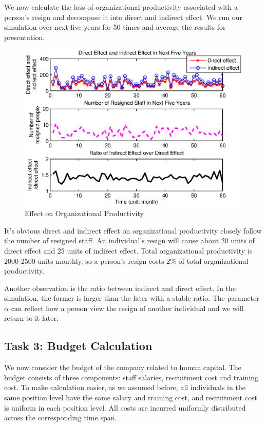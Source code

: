 \documentclass[tcn = 37075, sheet = false, abstract = false]{mcmthesis}
\begin{document}
We now calculate the loss of organizational productivity associated with a person's resign and decompose it into direct and indirect effect. We run our simulation over next five years for 50 times and average the results for presentation.

\begin{figure}[htb!]
\centering
\includegraphics[width=14cm]{Productivity_figure.eps}
\caption{Effect on Organizational Productivity} 
\label{fig:3}
\end{figure}

It's obvious direct and indirect effect on organizational productivity closely follow the number of resigned staff. An individual's resign will cause about 20 units of direct effect and 25 units of indirect effect. Total organizational productivity is 2000-2500 units monthly, so a person's resign costs 2\% of total organizational productivity.

Another observation is the ratio between indirect and direct effect. In the simulation, the former is larger than the later with a stable ratio. The parameter $\alpha$ can reflect how a person view the resign of another individual and we will return to it later.

\subsection{Task 3: Budget Calculation}

We now consider the budget of the company related to human capital. The budget consists of three components: staff salaries, recruitment cost and training cost. To make calculation easier, as we assumed before, all individuals in the same position level have the same salary and training cost, and recruitment cost is uniform in each position level. All costs are incurred uniformly distributed across the corresponding time span.
\end{document}
